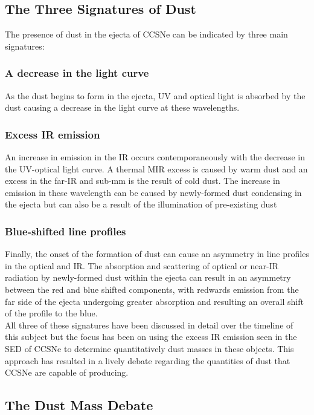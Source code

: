 \subsection{The Three Signatures of Dust}

The presence of dust in the ejecta of CCSNe can be indicated by three main signatures: 

\subsubsection{A decrease in the light curve} 
As the dust begins to form in the ejecta, UV and optical light is absorbed by the dust causing a decrease in the light curve at these wavelengths.

\subsubsection{Excess IR emission}
An increase in emission in the IR occurs contemporaneously with the decrease in the UV-optical light curve.  A thermal MIR excess is caused by warm dust and an excess in the far-IR and sub-mm is the result of cold dust.  The increase in emission in these wavelength can be caused by newly-formed dust condensing in the ejecta but can also be a result of the illumination of pre-existing dust

\subsubsection{Blue-shifted line profiles}
Finally, the onset of the formation of dust can cause an asymmetry in line profiles in the optical and IR.  The absorption and scattering of optical or near-IR radiation by newly-formed dust within the ejecta can result in an asymmetry between the red and blue shifted components, with redwards 
emission from the far side of the ejecta undergoing greater absorption and resulting an overall shift of the profile to the blue.
\\

\noindent All three of these signatures have been discussed in detail over the timeline of this subject but the focus has been on using the excess IR emission seen in the SED of CCSNe to determine quantitatively dust masses in these objects.  This approach has resulted in a lively debate regarding the quantities of dust that CCSNe are capable of producing.
 
\subsection{The Dust Mass Debate}

